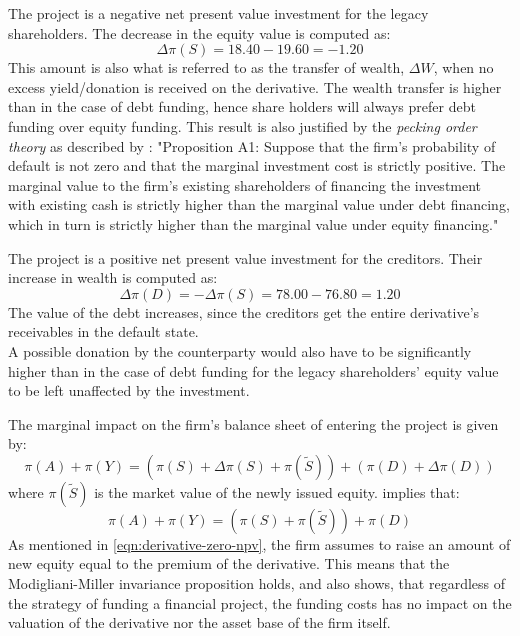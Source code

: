 \documentclass[../main.tex]{subfiles}
\begin{document}
        The project is a negative net present value investment for the legacy shareholders. The decrease in the equity value is computed as:
        \begin{equation}
            \Delta \pi(S) = 18.40 - 19.60 = -1.20
        \end{equation}
        This amount is also what is referred to as the transfer of wealth, $\Delta W$, when no excess yield/donation is received on the derivative. 
        The wealth transfer is higher than in the case of debt funding, hence share holders will always prefer debt funding over equity funding. 
        This result is also justified by the \textit{pecking order theory} as described by \cite{ADS2019}: "Proposition A1: Suppose that the firm's probability of default is not zero and that the marginal investment cost is strictly positive. The marginal value to the firm's existing shareholders of financing the investment with existing cash is strictly higher than the marginal value under debt financing, which in turn is strictly higher than the marginal value under equity financing."

        The project is a positive net present value investment for the creditors. 
        Their increase in wealth is computed as:
        \begin{equation}\label{eqn:wealth-transfer-equality}
            \Delta \pi(D) = -\Delta \pi(S) = 78.00 - 76.80 = 1.20
        \end{equation}
        The value of the debt increases, since the creditors get the entire derivative's receivables in the default state.\\
        A possible donation by the counterparty would also have to be significantly higher than in the case of debt funding for the legacy shareholders' equity value to be left unaffected by the investment. 

        The marginal impact on the firm's balance sheet of entering the project is given by:
        \begin{equation}
            \pi(A) + \pi(Y) = (\pi(S) + \Delta \pi(S) + \pi(\tilde{S})) + (\pi(D) + \Delta \pi(D))
        \end{equation}
        where $\pi(\tilde{S})$ is the market value of the newly issued equity. 
         implies that:
        \begin{equation}
            \pi(A) + \pi(Y) = (\pi(S) + \pi(\tilde{S})) + \pi(D)
        \end{equation}
        As mentioned in \cref{eqn:derivative-zero-npv}, the firm assumes to raise an amount of new equity equal to the premium of the derivative. 
        This means that the Modigliani-Miller invariance proposition holds, and also shows, that regardless of the strategy of funding a financial project, the funding costs has no impact on the valuation of the derivative nor the asset base of the firm itself.
\end{document}
